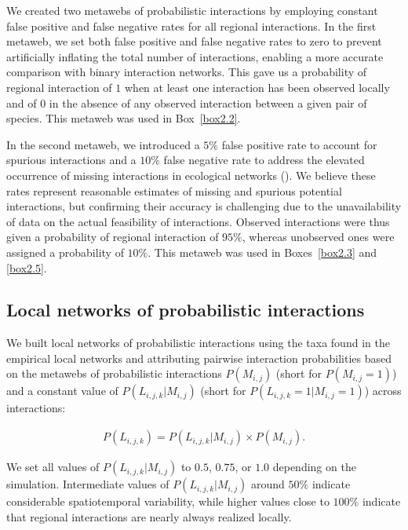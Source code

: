 \begin{refsection}
We created two metawebs of probabilistic interactions by employing constant
false positive and false negative rates for all regional interactions. In the
first metaweb, we set both false positive and false negative rates to zero to
prevent artificially inflating the total number of interactions, enabling a more
accurate comparison with binary interaction networks. This gave us a probability
of regional interaction of $1$ when at least one interaction has been observed
locally and of $0$ in the absence of any observed interaction between a given
pair of species. This metaweb was used in Box~\ref{box2.2}. 

In the second metaweb, we introduced a $5\%$ false positive rate to account for
spurious interactions and a $10\%$ false negative rate to address the elevated
occurrence of missing interactions in ecological networks
(\cite{Catchen2023Missinga}). We believe these rates represent reasonable
estimates of missing and spurious potential interactions, but confirming their
accuracy is challenging due to the unavailability of data on the actual
feasibility of interactions. Observed interactions were thus given a probability
of regional interaction of $95\%$, whereas unobserved ones were assigned a
probability of $10\%$. This metaweb was used in Boxes~\ref{box2.3} and
\ref{box2.5}.

\subsection{Local networks of probabilistic interactions}

We built local networks of probabilistic interactions using the taxa found in
the empirical local networks and attributing pairwise interaction probabilities
based on the metawebs of probabilistic interactions $P(M_{i, j})$ (short for
$P(M_{i, j} = 1)$) and a constant value of $P(L_{i, j, k}|M_{i, j})$ (short for
$P(L_{i, j, k} = 1|M_{i, j} = 1)$) across interactions:

\begin{eqnarray}
    \label{eq:local_meta_sup}
    P(L_{i, j, k}) = P(L_{i, j, k} | M_{i, j})
    \times P(M_{i, j}).
\end{eqnarray}

We set all values of $P(L_{i, j, k}|M_{i, j})$ to $0.5$, $0.75$, or $1.0$
depending on the simulation. Intermediate values of $P(L_{i, j, k}|M_{i, j})$
around $50\%$ indicate considerable spatiotemporal variability, while higher
values close to $100\%$ indicate that regional interactions are nearly always
realized locally. 


\end{refsection}
